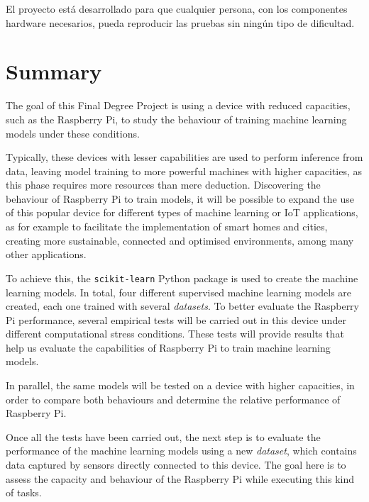 \documentclass[a4paper, 12pt]{book}
\begin{document}
El proyecto está desarrollado para que cualquier persona, con los componentes hardware necesarios, pueda reproducir las pruebas sin ningún tipo de dificultad.



\chapter*{Summary}

The goal of this Final Degree Project is using a device with reduced capacities, such as the Raspberry Pi, to study the behaviour of training machine learning models under these conditions. 

Typically, these devices with lesser capabilities are used to perform inference from data, leaving model training to more powerful machines with higher capacities, as this phase requires more resources than mere deduction. Discovering the behaviour of Raspberry Pi to train models, it will be possible to expand the use of this popular device for different types of machine learning or IoT applications, as for example to facilitate the implementation of smart homes and cities, creating more sustainable, connected and optimised environments, among many other applications.

To achieve this, the \texttt{scikit-learn} Python package is used to create the machine learning models. In total, four different supervised machine learning models are created, each one trained with several \textit{datasets}. To better evaluate the Raspberry Pi performance, several empirical tests will be carried out in this device under different computational stress conditions. These tests will provide results that  help us evaluate the capabilities of Raspberry Pi to train machine learning models.

In parallel, the same models will be tested on a device with higher capacities, in order to compare both behaviours and determine the relative performance of Raspberry Pi.

Once all the tests have been carried out, the next step is to evaluate the performance of the machine learning models using a new \textit{dataset}, which contains data captured by sensors directly connected to this device. The goal here is to assess the capacity and behaviour of the Raspberry Pi while executing this kind of tasks.
\end{document}
